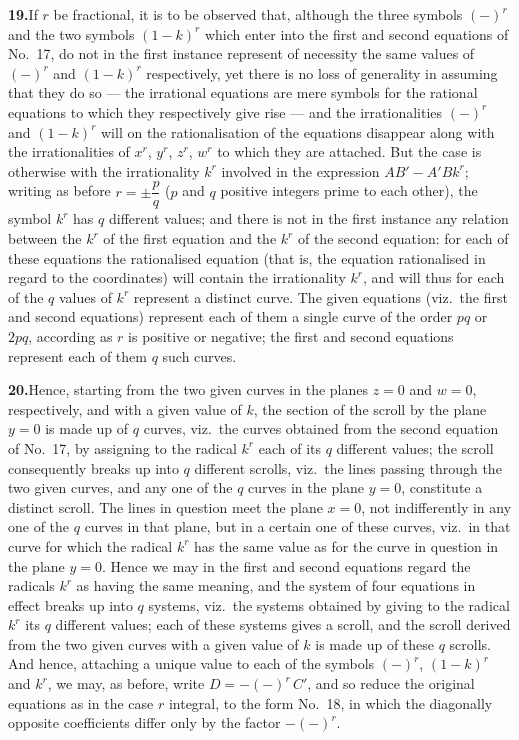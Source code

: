 \documentclass[11pt,a4paper]{article}
\begin{document}
\textbf{19.}\quad If $r$ be fractional, it is to be observed that, although the
three symbols $(-)^{r}$ and the two symbols $(1 - k)^{r}$ which enter into the
first and second equations of No.~17, do not in the first instance represent of
necessity the same values of $(-)^{r}$ and $(1 - k)^{r}$ respectively, yet
there is no loss of generality in assuming that they do so --- the irrational
equations are mere symbols for the rational equations to which they
respectively give rise --- and the irrationalities $(-)^{r}$ and $(1 - k)^{r}$
will on the rationalisation of the equations disappear along with the
irrationalities of $x^{r}$, $y^{r}$, $z^{r}$, $w^{r}$ to which they are
attached. But the case is otherwise with the irrationality $k^{r}$ involved in
the expression $AB' - A'B k^{r}$; writing as before $r = \pm\dfrac{p}{q}$ ($p$
and $q$ positive integers prime to each other), the symbol $k^{r}$ has $q$
different values; and there is not in the first instance any relation between
the $k^{r}$ of the first equation and the $k^{r}$ of the second equation: for
each of these equations the rationalised equation (that is, the equation
rationalised in regard to the coordinates) will contain the irrationality
$k^{r}$, and will thus for each of the $q$ values of $k^{r}$ represent a
distinct curve. The given equations (viz.\ the first and second equations)
represent each of them a single curve of the order $pq$ or $2pq$, according as
$r$ is positive or negative; the first and second equations represent each of
them $q$ such curves.

\textbf{20.}\quad Hence, starting from the two given curves in the planes
$z = 0$ and $w = 0$, respectively, and with a given value of $k$, the section
of the scroll by the plane $y = 0$ is made up of $q$ curves, viz.\ the curves
obtained from the second equation of No.~17, by assigning to the radical
$k^{r}$ each of its $q$ different values; the scroll consequently breaks up
into $q$ different scrolls, viz.\ the lines passing through the two given
curves, and any one of the $q$ curves in the plane $y = 0$, constitute a
distinct scroll. The lines in question meet the plane $x = 0$, not
indifferently in any one of the $q$ curves in that plane, but in a certain one
of these curves, viz.\ in that curve for which the radical $k^{r}$ has the same
value as for the curve in question in the plane $y = 0$. Hence we may in the
first and second equations regard the radicals $k^{r}$ as having the same
meaning, and the system of four equations in effect breaks up into $q$ systems,
viz.\ the systems obtained by giving to the radical $k^{r}$ its $q$ different
values; each of these systems gives a scroll, and the scroll derived from the
two given curves with a given value of $k$ is made up of these $q$ scrolls. And
hence, attaching a unique value to each of the symbols $(-)^{r}$, $(1 - k)^{r}$
and $k^{r}$, we may, as before, write $D = -(-)^{r}\,C'$, and so reduce the
original equations as in the case $r$ integral, to the form No.~18, in which
the diagonally opposite coefficients differ only by the factor $-(-)^{r}$.
\end{document}
